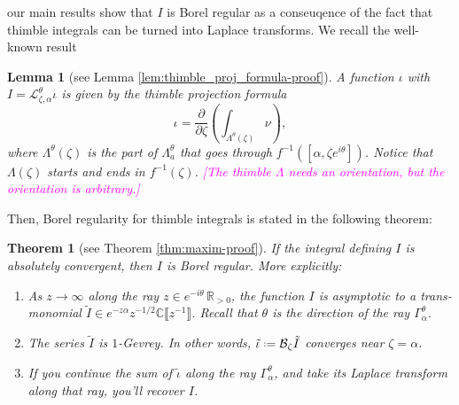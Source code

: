 \documentclass{article}
\newcommand{\R}{\mathbb{R}}
\newcommand{\C}{\mathbb{C}}
\newcommand{\fracderiv}[3]{\partial^{#1}_{#2, #3}}
\newcommand*{\defeq}{\mathrel{\vcenter{\baselineskip0.5ex \lineskiplimit0pt
                     \hbox{\scriptsize.}\hbox{\scriptsize.}}}%
                     =}
\newcommand{\laplace}{\mathcal{L}}
\newcommand{\borel}{\mathcal{B}}
\theoremstyle{definition}
\newtheorem{remark}[definition]{Remark}
\theoremstyle{plain}
\newtheorem{theorem}{Theorem}[section]
\newtheorem{lemma}[definition]{Lemma}
\newenvironment{verify}{\color{ForestGreen}}{\color{black}}
\begin{document}
our main results show that $I$ is Borel regular as a conseuqence of the fact that thimble integrals can be turned into Laplace transforms. We recall the well-known result
\begin{lemma}[see Lemma \ref{lem:thimble_proj_formula-proof}]\label{lem:thimble_proj_formula}
A function $\iota$ with $I = \laplace_{\zeta, \alpha}^\theta \iota$ is given by the {\em thimble projection formula}
\begin{equation}\label{eqn:formula}
\iota = \frac{\partial}{\partial \zeta} \left( \int_{\Lambda^\theta(\zeta)}\nu \right),
\end{equation}
where $\Lambda^\theta(\zeta)$ is the part of $\Lambda_a^\theta$ that goes through $f^{-1}([\alpha,\zeta e^{i\theta}])$. Notice that $\Lambda(\zeta)$ starts and ends in $f^{-1}(\zeta)$. \textcolor{magenta}{[The thimble $\Lambda$ needs an orientation, but the orientation is arbitrary.]}
\end{lemma}
Then, Borel regularity for thimble integrals is stated in the following theorem: 
\begin{theorem}[see Theorem \ref{thm:maxim-proof}]\label{thm:maxim}
If the integral defining $I$ is absolutely convergent, then $I$ is Borel regular. More explicitly: 
\begin{enumerate}
\item\label{part-1} As $z \to \infty$ along the ray $z \in e^{-i\theta}\,\R_{>0}$, the function $I$ is asymptotic to a trans-monomial $\tilde{I}\in e^{-z \alpha} z^{-1/2} \C\llbracket z^{-1}\rrbracket$. Recall that $\theta$ is the direction of the ray $\Gamma^\theta_\alpha$.
\item\label{part-2} The series $\tilde{I}$ is $1$-Gevrey. In other words, $\tilde{\iota} \defeq \borel_\zeta \tilde{I}$ converges near $\zeta=\alpha$.
\item\label{part-3} If you continue the sum of $\tilde{\iota}$ along the ray $\Gamma_\alpha^\theta$, and take its Laplace transform along that ray, you'll recover $I$.
\end{enumerate}
\end{theorem}
\end{document}
